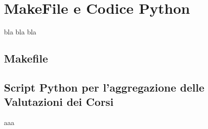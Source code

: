 \begin{appendices}
\label{appendix}
\chapter{MakeFile e Codice Python}
bla bla bla

    \section{Makefile}
    \label{appendix:makefile}
	    

    \section{Script Python per l'aggregazione delle Valutazioni dei Corsi}
    \label{appendix:teval}

    aaa

\end{appendices}
